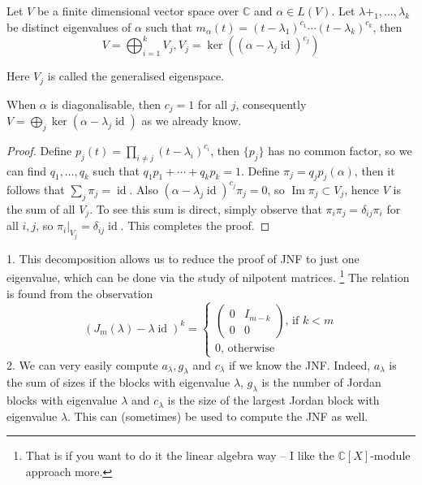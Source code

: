 \begin{theorem}
    Let $V$ be a finite dimensional vector space over $\mathbb C$ and $\alpha\in L(V)$.
    Let $\lambda+_1,\ldots,\lambda_k$ be distinct eigenvalues of $\alpha$ such that $m_\alpha(t)=(t-\lambda_1)^{c_1}\cdots(t-\lambda_k)^{c_k}$, then
    $$V=\bigoplus_{i=1}^kV_j,V_j=\ker((\alpha-\lambda_j\operatorname{id})^{c_j})$$
\end{theorem}
Here $V_j$ is called the generalised eigenspace.
\begin{remark}
    When $\alpha$ is diagonalisable, then $c_j=1$ for all $j$, consequently $V=\bigoplus_j\ker(\alpha-\lambda_j\operatorname{id})$ as we already know.
\end{remark}
\begin{proof}
    Define $p_j(t)=\prod_{i\neq j}(t-\lambda_i)^{c_i}$, then $\{p_j\}$ has no common factor, so we can find $q_1,\ldots,q_k$ such that $q_1p_1+\cdots+q_kp_k=1$.
    Define $\pi_j=q_jp_j(\alpha)$, then it follows that $\sum_j\pi_j=\operatorname{id}$.
    Also $(\alpha-\lambda_j\operatorname{id})^{c_j}\pi_j=0$, so $\operatorname{Im}\pi_j\subset V_j$, hence $V$ is the sum of all $V_j$.
    To see this sum is direct, simply observe that $\pi_i\pi_j=\delta_{ij}\pi_i$ for all $i,j$, so $\pi_i|_{V_j}=\delta_{ij}\operatorname{id}$.
    This completes the proof.
\end{proof}
\begin{remark}
    1. This decomposition allows us to reduce the proof of JNF to just one eigenvalue, which can be done via the study of nilpotent matrices.
    \footnote{That is if you want to do it the linear algebra way -- I like the $\mathbb C[X]$-module approach more.}
    The relation is found from the observation
    $$(J_m(\lambda)-\lambda\operatorname{id})^k=\begin{cases}
        \begin{pmatrix}
            0&I_{m-k}\\
            0&0
        \end{pmatrix}\text{, if $k<m$}\\
        0\text{, otherwise}
    \end{cases}$$
    2. We can very easily compute $a_\lambda,g_\lambda$ and $c_\lambda$ if we know the JNF.
    Indeed, $a_\lambda$ is the sum of sizes if the blocks with eigenvalue $\lambda$, $g_\lambda$ is the number of Jordan blocks with eigenvalue $\lambda$ and $c_\lambda$ is the size of the largest Jordan block with eigenvalue $\lambda$.
    This can (sometimes) be used to compute the JNF as well.
\end{remark}
